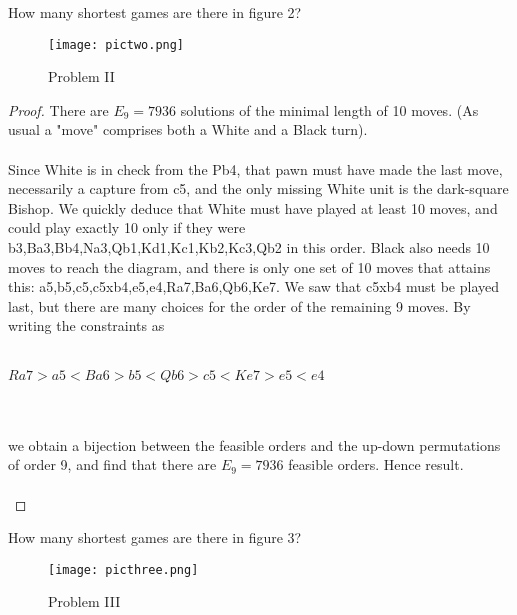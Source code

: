 \documentclass[12pt]{article}
\newenvironment{problem}[2][Problem]{\begin{trivlist}
\item[\hskip \labelsep {\bfseries #1}\hskip \labelsep {\bfseries #2.}]}{\end{trivlist}}
\begin{document}
\begin{problem}{II}
How many shortest games are there in figure 2?
\end{problem}

\begin{figure}[htbp] %
   \centering
   \texttt{[image: pictwo.png]} 
   \caption{Problem II}
   \label{fig:example}
\end{figure}

\begin{proof}
There are $E_9 = 7936$ solutions of the minimal length of 10 moves. (As usual a "move" comprises both a White and a Black turn). \\ \\ 
Since White is in check from the Pb4, that pawn must have made the last move, necessarily a capture from c5, and the only missing White unit is the dark-square Bishop. We quickly deduce that White must have played at least 10 moves, and could play exactly 10 only if they were b3,Ba3,Bb4,Na3,Qb1,Kd1,Kc1,Kb2,Kc3,Qb2 in this order. Black also needs 10 moves to reach the diagram, and there is only one set of 10 moves that attains this: a5,b5,c5,c5xb4,e5,e4,Ra7,Ba6,Qb6,Ke7. We saw that c5xb4 must be played last, but there are many choices for the order of the remaining 9 moves. By writing the constraints as \\ \\
\centerline{$Ra7 > a5 < Ba6 > b5 < Qb6 > c5 < Ke7 > e5 < e4$} \\ \\
we obtain a bijection between the feasible orders and the up-down permutations of order 9, and find that there are $E_9 = 7936$ feasible orders. Hence result. \\ \\
\end{proof}

\begin{problem}{III}
How many shortest games are there in figure 3?
\end{problem}

\begin{figure}[htbp] %
   \centering
   \texttt{[image: picthree.png]} 
   \caption{Problem III}
   \label{fig:example}
\end{figure}
\end{document}
